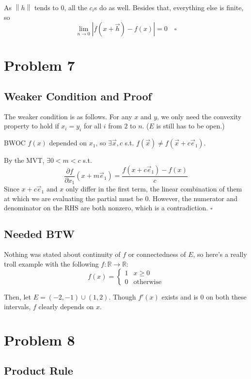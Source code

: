 \documentclass[12pt]{article}
\newcommand{\R}{\mathbb{R}}
\newcommand{\norm}[1]{\left\lVert#1\right\rVert}
\begin{document}
As $\norm{h}$ tends to $0$, all the $c_i$s do as well.
Besides that, everything else is finite, so
\[\lim_{n \to 0} |f(x+\vec{h})-f(x)| = 0\quad\square\]

\pagebreak

\section{Problem 7}

\subsection{Weaker Condition and Proof}

The weaker condition is as follows.
For any $x$ and $y$, we only need the convexity property to hold if
$x_i=y_i$ for all $i$ from $2$ to $n$. ($E$ is still has to be open.)

BWOC $f(x)$ depended on $x_1$, so $\exists \vec{x}, c$ s.t. $f(\vec{x}) \ne f(\vec{x}+c\vec{e}_1)$.

By the MVT, $\exists 0 < m < c$ s.t.
\[\frac{\partial f}{\partial x_1}(x+m\vec{e}_1)=\frac{f(x+c\vec{e}_1)-f(x)}{c}\]
Since $x+c\vec{e}_1$ and $x$ only differ in the first term,
the linear combination of them at which we are evaluating the partial must be $0$.
However, the numerator and denominator on the RHS are both nonzero,
which is a contradiction. $\square$

\subsection{Needed BTW}

Nothing was stated about continuity of $f$ or connectedness of $E$,
so here's a really troll example with the following $f: \R \to \R$:
\[f(x)=\begin{cases}
    1 & x \ge 0          \\
    0 & \text{otherwise}
  \end{cases}\]

Then, let $E=(-2, -1) \cup (1, 2)$.
Though $f'(x)$ exists and is $0$ on both these intervals,
$f$ clearly depends on $x$.

\pagebreak

\section{Problem 8}

\subsection{Product Rule}
\end{document}
